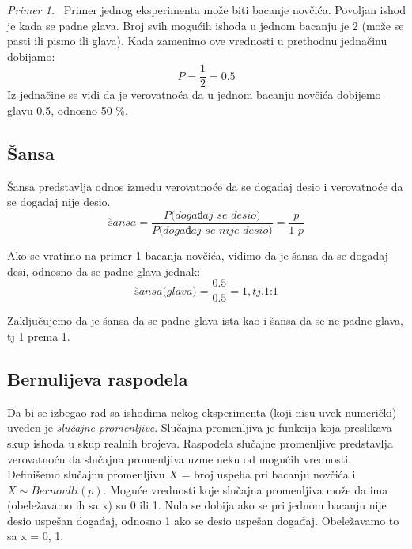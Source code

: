 \documentclass[a4paper,12pt]{report}
\begin{document}
 \textit {Primer 1.} \
Primer jednog eksperimenta može biti bacanje novčića. Povoljan ishod je kada se padne glava. Broj svih mogućih ishoda u jednom bacanju je 2 (može se pasti ili pismo ili glava). Kada zamenimo ove vrednosti u prethodnu jednačinu dobijamo: 
\begin{equation} \label{eq:2}
	P = \frac{1}{2} = 0.5
 \end{equation}
Iz jednačine se vidi da je verovatnoća da u jednom bacanju novčića dobijemo glavu 0.5, odnosno 50 \%.

\subsection{Šansa}

Šansa predstavlja odnos između verovatnoće da se događaj desio i verovatnoće da se događaj nije desio.
\begin{equation} \label{eq:3}
	\textit{šansa} = \frac{\textit{P(događaj se desio)}}{\textit{P(događaj se nije desio)}} = \frac{\textit{p}}{\textit{1-p}}
 \end{equation}

Ako se vratimo na primer 1 bacanja novčića, vidimo da je šansa da se događaj desi, odnosno da se padne glava jednak: 
\begin{equation} \label{eq:4}
	\textit{šansa(glava)} = \frac{0.5}{0.5} = 1, tj. \textit{1:1}
 \end{equation}
 
 Zaključujemo da je šansa da se padne glava ista kao i šansa da se ne padne glava, tj 1 prema 1. 
 
\subsection{Bernulijeva raspodela}

Da bi se izbegao rad sa ishodima nekog eksperimenta (koji nisu uvek numerički) uveden je \textit{slučajne promenljive}. Slučajna promenljiva je funkcija koja preslikava skup ishoda u skup realnih brojeva. Raspodela slučajne promenljive predstavlja verovatnoću da slučajna promenljiva uzme neku od mogućih vrednosti.\\

Definišemo slučajnu promenljivu $X$ = broj uspeha pri bacanju novčića i $X \sim Bernoulli(p)$. Moguće vrednosti koje slučajna promenljiva može da ima (obeležavamo ih sa x) su 0 ili 1. Nula se dobija ako se pri jednom bacanju nije desio uspešan događaj, odnosno 1 ako se desio uspešan događaj.  Obeležavamo to sa x = 0, 1. \\
\end{document}
